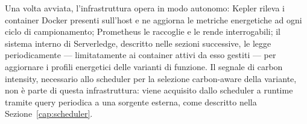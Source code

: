 Una volta avviata, l'infrastruttura opera in modo autonomo: Kepler 
rileva i container Docker presenti sull'host e ne aggiorna le metriche 
energetiche ad ogni ciclo di campionamento; Prometheus le raccoglie e 
le rende interrogabili; il sistema interno di Serverledge, descritto nelle sezioni successive,
le legge periodicamente --- limitatamente ai container attivi da esso gestiti --- per aggiornare i profili energetici 
delle varianti di funzione. Il segnale di carbon intensity, necessario allo scheduler 
per la selezione carbon-aware della variante, non è parte di questa infrastruttura: 
viene acquisito dallo scheduler a runtime tramite query periodica a una 
sorgente esterna, come descritto nella Sezione~\ref{cap:scheduler}.